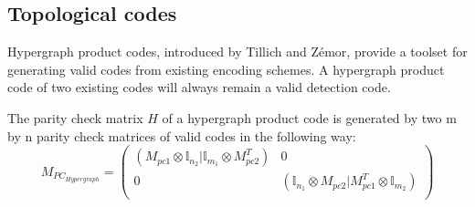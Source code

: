 \subsection{Topological codes}
Hypergraph product codes, introduced by Tillich and Z\'emor\cite{tillichzemor},
provide a toolset for generating valid codes
from existing encoding schemes.
A hypergraph product code of two
existing codes will always remain a valid detection code.

The parity check matrix $H$ of a hypergraph product code is generated
by two m by n parity check matrices of valid codes in the following
way:
\begin{equation}
	M_{PC_{Hypergraph}} = \left(\begin{array}{cc}
		\left(M_{pc1} \otimes \mathbb{I}_{n_2}| 
        \mathbb{I}_{m_1} \otimes M_{pc2}^T \right) & 0 \\
		0 & \left(\mathbb{I}_{n_1}\otimes 
        M_{pc2} | M_{pc1}^T \otimes \mathbb{I}_{m_2}\right)\\
	\end{array}\right)
\end{equation}






